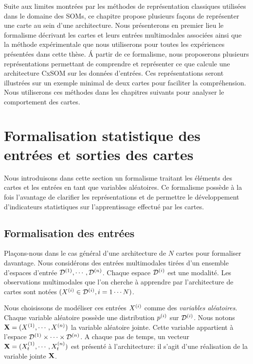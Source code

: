\documentclass[../main]{subfiles}
\begin{document}
Suite aux limites montrées par les méthodes de représentation classiques utilisées dans le domaine des SOMs, ce chapitre propose plusieurs façons de représenter une carte au sein d'une architecture.
Nous présenterons en premier lieu le formalisme décrivant les cartes et leurs entrées multimodales associées ainsi que la méthode expérimentale que nous utiliserons pour toutes les expériences présentées dans cette thèse. \'A partir de ce formalisme, nous proposerons plusieurs représentations permettant de comprendre et représenter ce que calcule une architecture CxSOM sur les données d'entrées. Ces représentations seront illustrées sur un exemple minimal de deux cartes pour faciliter la compréhension. 
Nous utiliserons ces méthodes dans les chapitres suivants pour analyser le comportement des cartes.

\section{Formalisation statistique des entrées et sorties des cartes}

Nous introduisons dans cette section un formalisme traitant les éléments des cartes et les entrées en tant que variables aléatoires. 
Ce formalisme possède à la fois l'avantage de clarifier les représentations et de permettre le développement d'indicateurs statistiques sur l'apprentissage effectué par les cartes.

\subsection{Formalisation des entrées}

Plaçons-nous dans le cas général d'une architecture de $N$ cartes pour formaliser davantage.
Nous considérons des entrées multimodales tirées d'un ensemble d'espaces d'entrée $\mathcal{D}^{({1})},\cdots,\mathcal{D}^{({n})}$. Chaque espace $\mathcal{D}^{({i})}$ est une modalité.
Les observations multimodales que l'on cherche à apprendre par l'architecture de cartes sont notées $(X^{({i})} \in \mathcal{D}^{({i})}, i = 1 \cdots N)$.

Nous choisissons de modéliser ces entrées $X^{({i})}$ comme des \emph{variables aléatoires}.
Chaque variable aléatoire possède une distribution $p^{({i})}$ sur $\mathcal{D}^{({i})}$.
Nous notons $\mathbf{X} = (X^{({1})}, \cdots, X^{({n})})$ la variable aléatoire jointe.
Cette variable appartient à l'espace $\mathcal{D}^{({1})} \times \cdots \times \mathcal{D}^{({n})}$.
A chaque pas de temps, un vecteur $\mathbf{X} = (X^{({1})}_t, \cdots , X^{({n})}_t)$ est présenté à l'architecture: il s'agit d'une réalisation de la variable jointe $\mathbf{X}$. 
\end{document}
